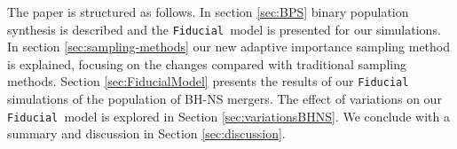 \documentclass[a4paper,fleqn,usenatbib,useAMS,usedcolumn]{mnras}
\newcommand\Fiducial{\texttt{Fiducial }}
\newcommand{\AISs}{\texttt{STROOPWAFEL}}%
\begin{document}


The paper is structured as follows. In section \ref{sec:BPS} binary population synthesis is described and the \Fiducial model is presented for our simulations. In section \ref{sec:sampling-methods} our new adaptive importance sampling method is explained, focusing on the changes compared with traditional sampling methods. 
Section \ref{sec:FiducialModel}  presents the results of our  \Fiducial simulations of the population of BH-NS mergers.  
The effect of variations on our \Fiducial model is explored in Section \ref{sec:variationsBHNS}. We conclude with a summary and discussion in Section \ref{sec:discussion}. 
\end{document}
